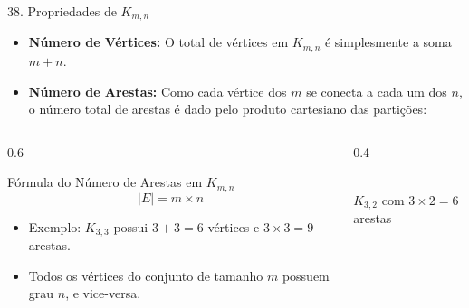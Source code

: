 \documentclass[9pt]{beamer}
\begin{document}
    \begin{frame}{38. Propriedades de $K_{m,n}$}
        \begin{itemize}
            \item \textbf{Número de Vértices:} O total de vértices em $K_{m,n}$ é simplesmente a soma $m + n$.
            \item \textbf{Número de Arestas:} Como cada vértice dos $m$ se conecta a cada um dos $n$, o número total de arestas é dado pelo produto cartesiano das partições:
        \end{itemize}
        \begin{columns}
            \begin{column}{0.6\textwidth}
                \begin{block}{Fórmula do Número de Arestas em $K_{m,n}$}
                    \[ |E| = m \times n \]
                \end{block}
                \begin{itemize}
                    \item Exemplo: $K_{3,3}$ possui $3+3 = 6$ vértices e $3 \times 3 = 9$ arestas.
                    \item Todos os vértices do conjunto de tamanho $m$ possuem grau $n$, e vice-versa.
                \end{itemize}
            \end{column}
            \begin{column}{0.4\textwidth}
                \centering
                \\
                \vspace{0.2cm}
                \tiny $K_{3,2}$ com $3 \times 2 = 6$ arestas
            \end{column}
        \end{columns}
    \end{frame}
\end{document}
